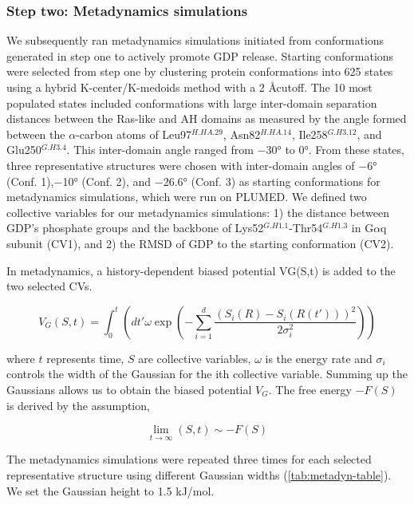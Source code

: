 \documentclass[../main.tex]{subfiles}
\begin{document}
        \subsubsection{Step two: Metadynamics simulations}
            We subsequently ran metadynamics simulations\cite{Laio:2002ft,Tribello:2014eb} initiated from conformations generated in step one to actively promote GDP release. Starting conformations were selected from step one by clustering protein conformations into 625 states using a hybrid K-center/K-medoids method\cite{Beauchamp:2011he} with a 2 \AA cutoff. The 10 most populated states included conformations with large inter-domain separation distances between the Ras-like and AH domains as measured by the angle formed between the $\alpha$-carbon atoms of Leu97$^{H.HA.29}$, Asn82$^{H.HA.14}$, Ile258$^{G.H3.12}$, and Glu250$^{G.H3.4}$. This inter-domain angle ranged from $-$30° to 0°. From these states, three representative structures were chosen with inter-domain angles of $-$6° (Conf. 1),$-$10° (Conf. 2), and $-$26.6° (Conf. 3) as starting conformations for metadynamics simulations, which were run on PLUMED\cite{Tribello:2014eb}. We defined two collective variables for our metadynamics simulations: 1) the distance between GDP’s phosphate groups and the backbone of Lys52$^{G.H1.1}$-Thr54$^{G.H1.3}$ in G$\alpha$q subunit (CV1), and 2) the RMSD of GDP to the starting conformation (CV2).

            In metadynamics, a history-dependent biased potential VG(S,t) is added to the two selected CVs.

            \begin{equation}\label{metadyn-eq}
            V_{G}(S,t)=\int_{0}^{t}{(dt'\omega\exp{(-\sum_{i=1}^{d}\frac{(S_{i}(R)-S_{i}(R(t')))^2}{2\sigma_{i}^{2}})})}
            \end{equation}

            where $t$ represents time, $S$ are collective variables, $\omega$ is the energy rate and $\sigma_{i}$ controls the width of the Gaussian for the ith collective variable. Summing up the Gaussians allows us to obtain the biased potential $V_{G}$. The free energy $-F(S)$ is derived by the assumption,

            \begin{equation}\label{limit-metadyn-eq}
            \lim_{t\rightarrow\infty}{(S,t)}\sim-F(S)
            \end{equation}

            The metadynamics simulations were repeated three times for each selected representative structure using different Gaussian widths (\ref{tab:metadyn-table}). We set the Gaussian height to 1.5 kJ/mol.
\end{document}
